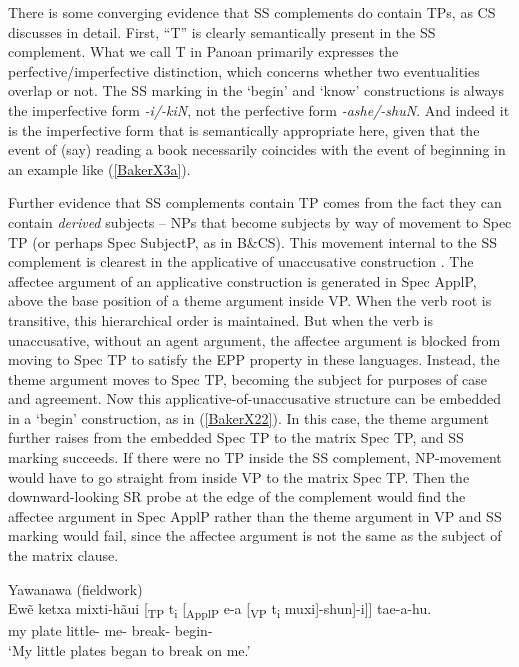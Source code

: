 \documentclass[output=paper]{langscibook}
\begin{document}
There is some converging evidence that SS complements do contain TPs, as CS discusses in detail. First, “T” is clearly semantically present in the SS complement. What we call T in Panoan primarily expresses the perfective/imperfective distinction, which concerns whether two eventualities overlap or not. The SS marking in the `begin’ and `know’ constructions is always the imperfective form \textit{-i/-kiN}, not the perfective form \textit{-ashe/-shuN}. And indeed it is the imperfective form that is semantically appropriate here, given that the event of (say) reading a book necessarily coincides with the event of beginning in an example like (\ref{BakerX3a}).

Further evidence that SS complements contain TP comes from the fact they can contain \textit{derived} subjects – NPs that become subjects by way of movement to Spec TP (or perhaps Spec SubjectP, as in B\&CS). This movement internal to the SS complement is clearest in the applicative of unaccusative construction \citep[see][]{baker2014dependent}. The affectee argument of an applicative construction is generated in Spec ApplP, above the base position of a theme argument inside VP. When the verb root is transitive, this hierarchical order is maintained. But when the verb is unaccusative, without an agent argument, the affectee argument is blocked from moving to Spec TP to satisfy the EPP property in these languages. Instead, the theme argument moves to Spec TP, becoming the subject for purposes of case and agreement. Now this applicative-of-unaccusative structure can be embedded in a `begin’ construction, as in (\ref{BakerX22}). In this case, the theme argument further raises from the embedded Spec TP to the matrix Spec TP, and SS marking succeeds. If there were no TP inside the SS complement, NP-movement would have to go straight from inside VP to the matrix Spec TP. Then the downward-looking SR probe at the edge of the complement would find the affectee argument in Spec ApplP rather than the theme argument in VP and SS marking would fail, since the affectee argument is not the same as the subject of the matrix clause.

\begin{exe}
    \ex Yawanawa (fieldwork) \label{BakerX22}\\
		\small	\gll Ewẽ ketxa {mixti-hãui [\textsubscript{TP} t\textsubscript{i}} {[\textsubscript{ApplP} e-a} {[\textsubscript{VP} t\textsubscript{i} muxi]-shun]-i]}] tae-a-hu.\\
			    my plate little- me- break- begin-\\
			    \glt `My little plates began to break on me.'
\end{exe}
\end{document}

